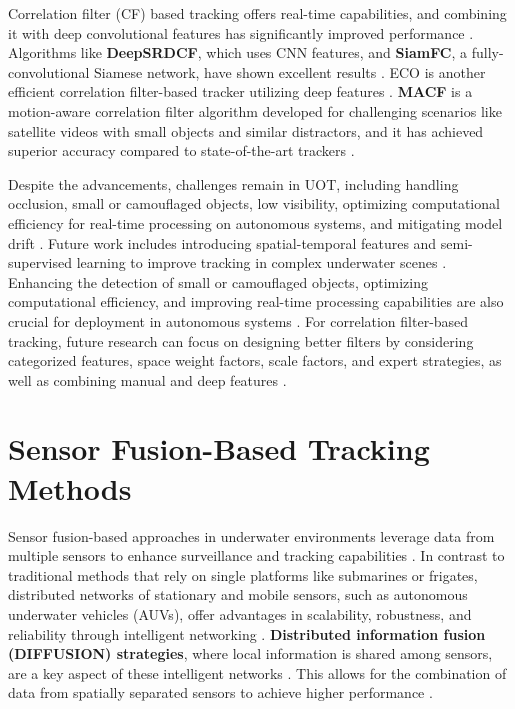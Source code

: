 Correlation filter (CF) based tracking offers real-time capabilities, and combining it with deep convolutional features has significantly improved performance \cite{qiu2024boundary}\cite{du2021overview}\cite{zhao2020correlation}\cite{lin2024motion}. Algorithms like \textbf{DeepSRDCF}, which uses CNN features, and \textbf{SiamFC}, a fully-convolutional Siamese network, have shown excellent results \cite{zhao2020correlation}. ECO is another efficient correlation filter-based tracker utilizing deep features \cite{zhao2020correlation}\cite{feng2019dynamic}\cite{lin2024motion}. \textbf{MACF} is a motion-aware correlation filter algorithm developed for challenging scenarios like satellite videos with small objects and similar distractors, and it has achieved superior accuracy compared to state-of-the-art trackers \cite{lin2024motion}.

Despite the advancements, challenges remain in UOT, including handling occlusion, small or camouflaged objects, low visibility, optimizing computational efficiency for real-time processing on autonomous systems, and mitigating model drift \cite{qiu2024boundary}\cite{mathias2022occlusion}\cite{zhang2024webuot}\cite{lin2024motion}. Future work includes introducing spatial-temporal features and semi-supervised learning to improve tracking in complex underwater scenes \cite{qiu2024boundary}\cite{mathias2022occlusion}. Enhancing the detection of small or camouflaged objects, optimizing computational efficiency, and improving real-time processing capabilities are also crucial for deployment in autonomous systems \cite{elmezain2025advancing}. For correlation filter-based tracking, future research can focus on designing better filters by considering categorized features, space weight factors, scale factors, and expert strategies, as well as combining manual and deep features \cite{du2021overview}.



\section{Sensor Fusion-Based Tracking Methods}
Sensor fusion-based approaches in underwater environments leverage data from multiple sensors to enhance surveillance and tracking capabilities \cite{braca2015distributed}\cite{tharmarasa2007large}\cite{uney2022passive}. In contrast to traditional methods that rely on single platforms like submarines or frigates, distributed networks of stationary and mobile sensors, such as autonomous underwater vehicles (AUVs), offer advantages in scalability, robustness, and reliability through intelligent networking \cite{braca2015distributed}. \textbf{Distributed information fusion (DIFFUSION) strategies}, where local information is shared among sensors, are a key aspect of these intelligent networks \cite{braca2015distributed}. This allows for the combination of data from spatially separated sensors to achieve higher performance \cite{braca2015distributed}.


